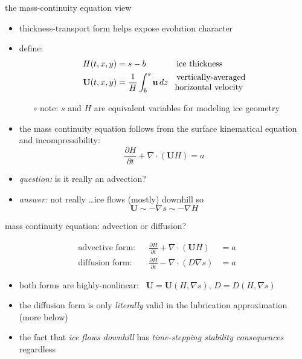 \documentclass[svgnames,
               hyperref={colorlinks,citecolor=DeepPink4,linkcolor=FireBrick,urlcolor=Maroon},
               usepdftitle=false]  %
               {beamer}
\newcommand{\grad}{\nabla}
\newcommand{\bu}{\mathbf{u}}
\newcommand{\bU}{\mathbf{U}}
\begin{document}
\begin{frame}{the mass-continuity equation view}

\begin{itemize}
\item thickness-transport form helps expose evolution character
\item define:
\begin{align*}
H(t,x,y) &=s-b && \text{ice thickness} \\
\bU(t,x,y) &= \frac{1}{H} \int_b^s \bu \,dz && \begin{matrix} \text{vertically-averaged} \\ \hspace{-1.8mm} \text{horizontal velocity} \end{matrix}
\end{align*}

    \begin{itemize}
    \item[$\circ$] note: $s$ and $H$ are equivalent variables for modeling ice geometry
    \end{itemize}
\item<2-> the \alert{mass continuity equation} follows from the surface kinematical equation and incompressibility:
   $$\frac{\partial H}{\partial t} + \nabla \cdot \left(\bU H\right) = a$$

\smallskip
\item<3-> \emph{question:} is it really an advection?
\item<3->[] \emph{answer:} not really \dots ice flows (mostly) downhill so
  $$\bU \sim - \grad s \sim - \grad H$$
\end{itemize}
\end{frame}


\begin{frame}{mass continuity equation: advection or diffusion?}

\begin{align*}
\text{advective form:} && \frac{\partial H}{\partial t} + \nabla \cdot \left(\bU H\right) &= a \\
\text{diffusion form:} && \frac{\partial H}{\partial t} - \nabla \cdot \left(D \grad s\right) &= a
\end{align*}
\begin{itemize}
\item both forms are highly-nonlinear: \, $\bU=\bU(H,\grad s), \, D = D(H,\grad s)$
\item the diffusion form is only \emph{literally} valid in the lubrication approximation (more below)
\item the fact that \emph{ice flows downhill} has \emph{time-stepping stability consequences} regardless
\end{itemize}
\end{frame}
\end{document}
